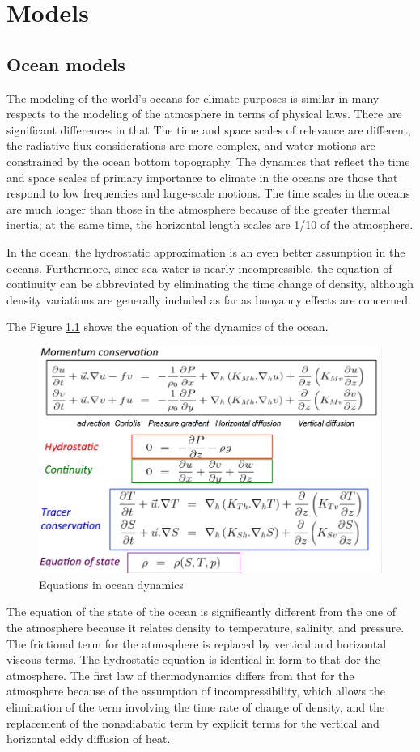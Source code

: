 
\chapter{Models}

\section{Ocean models}
The modeling of the world's oceans for climate purposes is similar in many respects to the modeling of the atmosphere in terms of physical laws. There are significant differences in that
The time and space scales of relevance are different, the radiative flux considerations are more complex, and water motions are constrained by the ocean bottom topography.
The dynamics that reflect the time and space scales of primary importance to climate in the oceans are those that respond to low frequencies and large-scale motions.
The time scales in the oceans are much longer than those in the atmosphere because of the greater thermal inertia; at the same time, the horizontal length scales are 1/10 of the atmosphere.

In the ocean, the hydrostatic approximation is an even better assumption in the oceans. Furthermore, since sea water is nearly incompressible, the equation of continuity can be abbreviated by eliminating the time change of density, although density variations are generally included as far as buoyancy effects are concerned.

The Figure \ref{fig:equations in ocean dyn} shows the equation of the dynamics of the ocean.


\begin{figure}[h!]
	\centering
	\includegraphics[width=0.4\linewidth]{uploads/Screenshot 2024-11-21 225126.png}
	\caption{Equations in ocean dynamics}
	\label{fig:equations in ocean dyn}
\end{figure}
The equation of the state of the ocean is significantly different from the one of the atmosphere because it relates density to temperature, salinity, and pressure.
The frictional term for the atmosphere is replaced by vertical and horizontal viscous terms.
The hydrostatic equation is identical in form to that dor the atmosphere.
The first law of thermodynamics differs from that for the atmosphere because of the assumption of incompressibility, which allows the elimination of the term involving the time rate of change of density, and the replacement of the nonadiabatic term by explicit terms for the vertical and horizontal eddy diffusion of heat. \\


